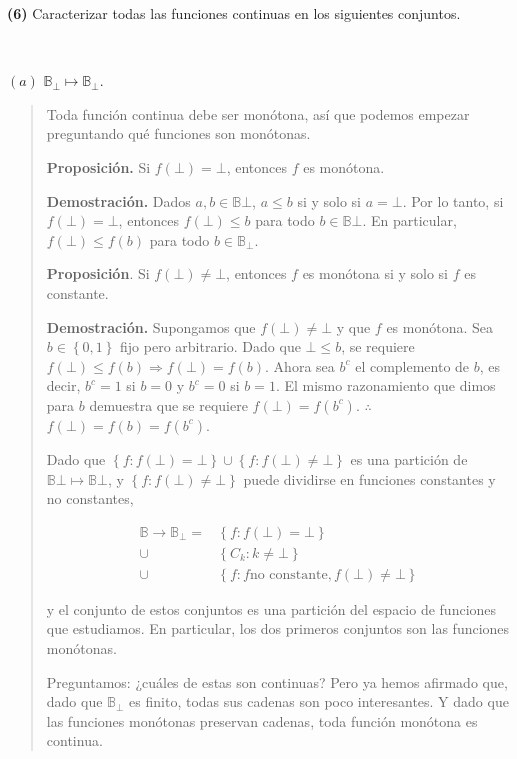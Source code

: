 \documentclass[article, 12pt]{article}
\begin{document}
\pagebreak 


\textbf{(6)} Caracterizar todas las funciones continuas en los siguientes
conjuntos.

~ 

$(a)$ $\mathbb{B}_\bot \mapsto \mathbb{B}_\bot $.


\small
\begin{quote}

Toda función continua debe ser monótona, así que podemos empezar preguntando qué
funciones son monótonas.

\textbf{Proposición.} Si $f(\bot) = \bot$, entonces $f$ es monótona.

\textbf{Demostración.} Dados $a, b \in \mathbb{B}\bot $, $a \leq b$ si y solo si $a = \bot$. Por lo tanto, si $f(\bot) = \bot $, entonces $f(\bot) \leq b$ para todo $b \in \mathbb{B}\bot$. En particular, $f(\bot ) \leq f(b)$ para todo $b \in \mathbb{B}_\bot $.

\textbf{Proposición}. Si $f(\bot) \neq \bot $, entonces $f$ es monótona si y solo si $f$ es constante.

\textbf{Demostración.} Supongamos que $f(\bot ) \neq \bot $ y que $f$ es
monótona. Sea $b \in \left\{ 0, 1 \right\} $ fijo pero arbitrario. Dado que $\bot
\leq b$, se requiere $f(\bot) \leq f(b) \Rightarrow f(\bot ) = f(b)$. Ahora sea
$b^c$ el complemento de $b$, es decir, $b^c = 1$ si $b = 0$ y $b^c = 0$ si $b =
1$. El mismo razonamiento que dimos para $b$ demuestra que se requiere $f(\bot )
= f(b^c)$. $\therefore $ $f(\bot ) = f(b) = f(b^c)$.

Dado que $\left\{ f : f(\bot) = \bot \right\} \cup \left\{ f : f(\bot ) \neq
\bot \right\} $ es una partición de $\mathbb{B}\bot \mapsto \mathbb{B}\bot $, y
$\left\{ f : f(\bot ) \neq \bot \right\} $ puede dividirse en funciones constantes y no constantes,

\begin{align*} \mathbb{B} \to \mathbb{B}_\bot = &\left\{ f : f(\bot ) = \bot
\right\} \\ \cup &\left\{ C_k : k \neq \bot \right\}\\ \cup &\left\{ f : f \text{
no constante}, f(\bot ) \neq \bot \right\} \end{align*}

y el conjunto de estos conjuntos es una partición del espacio de funciones que
estudiamos. En particular, los dos primeros conjuntos son las funciones monótonas.

Preguntamos: ¿cuáles de estas son continuas? Pero ya hemos afirmado que, dado que $\mathbb{B}_\bot $ es finito, todas sus cadenas son poco interesantes. Y dado que las funciones monótonas preservan cadenas, toda función monótona es continua.


\end{quote}
\end{document}

